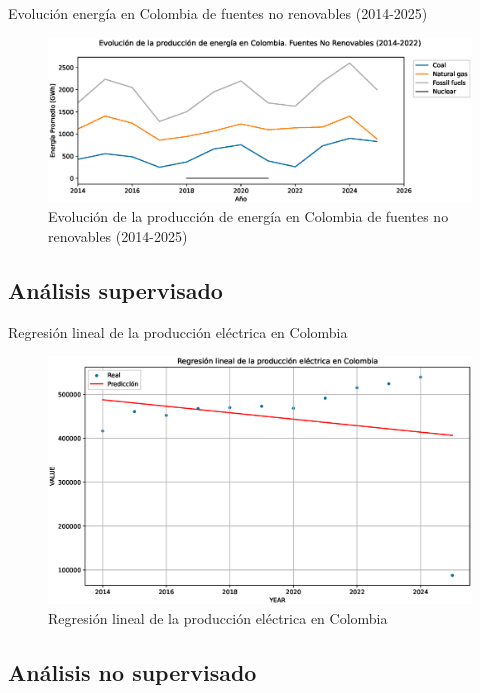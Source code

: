 \documentclass[10pt]{beamer}
\begin{document}
\begin{frame}[fragile]{Evolución energía en Colombia de fuentes no renovables (2014-2025)}
		\begin{figure}[t]
			\centering
			\includegraphics[width=0.7\linewidth]{../../reports/fig_17}
			\caption{Evolución de la producción de energía en Colombia de fuentes no renovables (2014-2025)}
			\label{fig:fig17}
\end{figure}
\end{frame}
	
\subsection{Análisis supervisado}
	
\begin{frame}[fragile]{Regresión lineal de la producción eléctrica en Colombia}
\begin{figure}[t]
			\centering
			\includegraphics[width=0.7\linewidth]{../../reports/fig_18}
			\caption{Regresión lineal de la producción eléctrica en Colombia}
			\label{fig:fig18}
\end{figure}
\end{frame}
	
\subsection{Análisis no supervisado}
	
\end{document}
